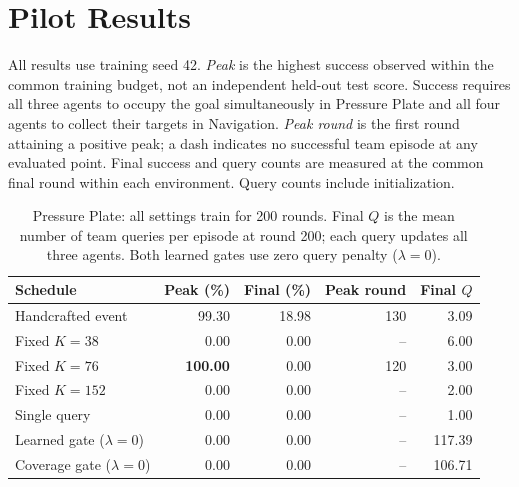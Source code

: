 \documentclass{article}
\begin{document}
\label{main:end}
\clearpage
\appendix
\onecolumn

\section{Pilot Results}
\label{app:results}

All results use training seed 42. \emph{Peak} is the highest success observed within the common training budget, not an independent held-out test score. Success requires all three agents to occupy the goal simultaneously in Pressure Plate and all four agents to collect their targets in Navigation. \emph{Peak round} is the first round attaining a positive peak; a dash indicates no successful team episode at any evaluated point. Final success and query counts are measured at the common final round within each environment. Query counts include initialization.

\begin{table}[ht]
\centering
\small
\setlength{\tabcolsep}{5pt}
\caption{Pressure Plate: all settings train for 200 rounds. Final $Q$ is the mean number of team queries per episode at round 200; each query updates all three agents. Both learned gates use zero query penalty ($\lambda=0$).}
\label{tab:pp}
\begin{tabular}{lrrrr}
\toprule
Schedule & Peak (\%) & Final (\%) & Peak round & Final $Q$ \\
\midrule
Handcrafted event & 99.30 & 18.98 & 130 & 3.09 \\
Fixed $K=38$      & 0.00 & 0.00 & -- & 6.00 \\
Fixed $K=76$      & \textbf{100.00} & 0.00 & 120 & 3.00 \\
Fixed $K=152$     & 0.00 & 0.00 & -- & 2.00 \\
Single query      & 0.00 & 0.00 & -- & 1.00 \\
Learned gate ($\lambda=0$) & 0.00 & 0.00 & -- & 117.39 \\
Coverage gate ($\lambda=0$) & 0.00 & 0.00 & -- & 106.71 \\
\bottomrule
\end{tabular}
\end{table}
\end{document}
